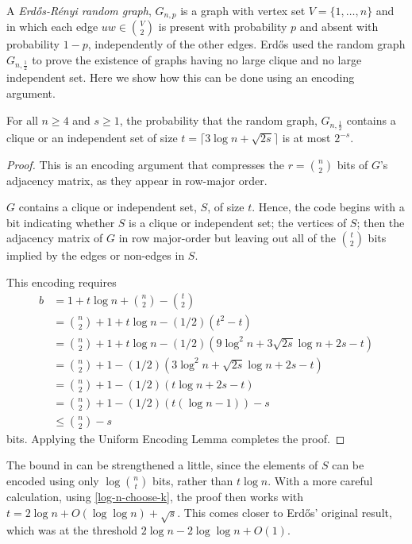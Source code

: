 \documentclass{patmorin}
\begin{document}
A \emph{Erd\H{o}s-R\'enyi random graph}, $G_{n,p}$ is a graph with vertex
set $V=\{1,\ldots,n\}$ and in which each edge $uw\in \binom{V}{2}$
is present with probability $p$ and absent with probability $1-p$,
independently of the other edges.  Erd\H{o}s \cite{erdos:some} used the random
graph $G_{n,\frac{1}{2}}$ to prove the existence of graphs having no
large clique and no large independent set. Here we show how this can be
done using an encoding argument.

\begin{thm}
  For all $n\ge 4$ and $s\ge 1$, the probability that the random graph,
  $G_{n,\frac{1}{2}}$ contains a clique or an independent set of size $t =
  \lceil 3\log n + \sqrt{2s}\rceil$ is at most $2^{-s}$.
\end{thm}

\begin{proof}
  This is an encoding argument that compresses the $r=\binom{n}{2}$
  bits of $G$'s adjacency matrix, as they appear in row-major order.
  
  $G$ contains a clique or independent set, $S$, of size $t$. Hence,
  the code begins with a bit indicating whether $S$ is a clique or
  independent set; the vertices of $S$; then the adjacency matrix of
  $G$ in row major-order but leaving out all of the $\binom{t}{2}$
  bits implied by the edges or non-edges in $S$.
  
  This encoding requires
  \begin{align*}
     b & = 1 + t\log n + \binom{n}{2}-\binom{t}{2} \\
       & = \binom{n}{2} + 1 + t\log n - (1/2)(t^2 - t) \\
       & = \binom{n}{2} + 1 + t\log n 
            - (1/2)\left(9\log^2 n +3\sqrt{2s}\log n + 2s - t\right) \\
       & = \binom{n}{2} + 1 
            - (1/2)\left(3\log^2 n + \sqrt{2s}\log n + 2s - t\right) \\
       & = \binom{n}{2} + 1 
            - (1/2)\left(t\log n + 2s - t\right) \\
       & = \binom{n}{2} + 1 
            - (1/2)\left(t(\log n-1)\right) - s \\
       & \le \binom{n}{2} - s 
  \end{align*}
  bits. Applying the Uniform Encoding Lemma completes the proof.
\end{proof}

\begin{rem}
  The bound in  can be strengthened a little,
  since the elements of $S$ can be encoded using only $\log\binom{n}{t}$
  bits, rather than $t\log n$.  With a more careful calculation, using
  \eqref{log-n-choose-k}, the proof then works with $t=2\log n +O(\log\log
  n) + \sqrt{s}$. This comes closer to Erdős' original result, which
  was at the threshold $2\log n - 2\log\log n + O(1)$.
\end{rem}
\end{document}
